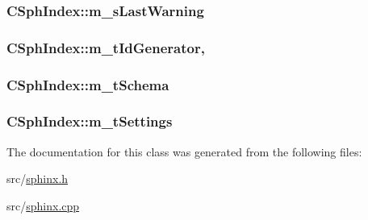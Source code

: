 \hypertarget{classCSphIndex_abf793551148df7d12d6f0f617c661a62}{
\subsubsection[{m\-\_\-s\-Last\-Warning}]{ C\-Sph\-Index\-::m\-\_\-s\-Last\-Warning\hspace{0.3cm}{\ttfamily [protected]}}}\label{classCSphIndex_abf793551148df7d12d6f0f617c661a62}
\hypertarget{classCSphIndex_a331d31cbb0391b8ca783401d00f89141}{
\subsubsection[{m\-\_\-t\-Id\-Generator}]{ C\-Sph\-Index\-::m\-\_\-t\-Id\-Generator\hspace{0.3cm}{\ttfamily [static]}, {\ttfamily [protected]}}}\label{classCSphIndex_a331d31cbb0391b8ca783401d00f89141}
\hypertarget{classCSphIndex_af5bf057700ea6e47138e5205ab6b2271}{
\subsubsection[{m\-\_\-t\-Schema}]{ C\-Sph\-Index\-::m\-\_\-t\-Schema\hspace{0.3cm}{\ttfamily [protected]}}}\label{classCSphIndex_af5bf057700ea6e47138e5205ab6b2271}
\hypertarget{classCSphIndex_a59dedae41c574242e5e79d0374ed19fe}{
\subsubsection[{m\-\_\-t\-Settings}]{ C\-Sph\-Index\-::m\-\_\-t\-Settings\hspace{0.3cm}{\ttfamily [protected]}}}\label{classCSphIndex_a59dedae41c574242e5e79d0374ed19fe}


The documentation for this class was generated from the following files\-:\begin{DoxyCompactItemize}
\item 
src/\hyperlink{sphinx_8h}{sphinx.\-h}\item 
src/\hyperlink{sphinx_8cpp}{sphinx.\-cpp}\end{DoxyCompactItemize}
